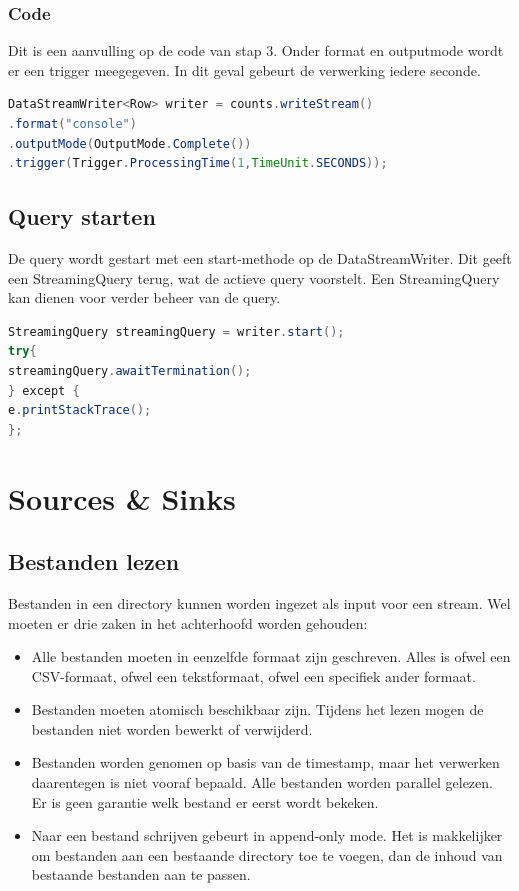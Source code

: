 \documentclass[a4paper,10pt,twoside]{report}
\begin{document}
\subsubsection{Code}

Dit is een aanvulling op de code van stap 3. Onder format en outputmode wordt er een trigger meegegeven. In dit geval gebeurt de verwerking iedere seconde. 

\begin{lstlisting}[language=Java]
DataStreamWriter<Row> writer = counts.writeStream()
.format("console")
.outputMode(OutputMode.Complete())
.trigger(Trigger.ProcessingTime(1,TimeUnit.SECONDS));
\end{lstlisting}

\subsection{Query starten}

De query wordt gestart met een start-methode op de DataStreamWriter. Dit geeft een StreamingQuery terug, wat de actieve query voorstelt. Een StreamingQuery kan dienen voor verder beheer van de query.

\begin{lstlisting}[language=Java]
StreamingQuery streamingQuery = writer.start();
try{
streamingQuery.awaitTermination();
} except {
e.printStackTrace();
};
\end{lstlisting}

\section{Sources \& Sinks}

\subsection{Bestanden lezen}

Bestanden in een directory kunnen worden ingezet als input voor een stream. Wel moeten er drie zaken in het achterhoofd worden gehouden:

\begin{itemize}
\item Alle bestanden moeten in eenzelfde formaat zijn geschreven. Alles is ofwel een CSV-formaat, ofwel een tekstformaat, ofwel een specifiek ander formaat.
\item Bestanden moeten atomisch beschikbaar zijn. Tijdens het lezen mogen de bestanden niet worden bewerkt of verwijderd.
\item Bestanden worden genomen op basis van de timestamp, maar het verwerken daarentegen is niet vooraf bepaald. Alle bestanden worden parallel gelezen. Er is geen garantie welk bestand er eerst wordt bekeken.
\item Naar een bestand schrijven gebeurt in append-only mode. Het is makkelijker om bestanden aan een bestaande directory toe te voegen, dan de inhoud van bestaande bestanden aan te passen.
\end{itemize}
\end{document}
